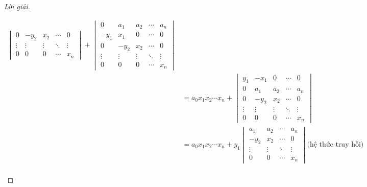 \documentclass[class=linearalgebra,crop=false]{standalone}
\begin{document}
\begin{proof}[Lời giải]
\begin{enumerate}[label = (\alph*)]
\begin{align*}
\begin{vmatrix}
                      0      & -y_{2} & x_{2}  & \cdots & 0      \\
                      \vdots & \vdots & \vdots & \ddots & \vdots \\
                      0      & 0      & 0      & \cdots & x_{n}
                  \end{vmatrix}
                  +
                  \begin{vmatrix}
                      0      & a_{1}  & a_{2}  & \cdots & a_{n}  \\
                      -y_{1} & x_{1}  & 0      & \cdots & 0      \\
                      0      & -y_{2} & x_{2}  & \cdots & 0      \\
                      \vdots & \vdots & \vdots & \ddots & \vdots \\
                      0      & 0      & 0      & \cdots & x_{n}
                  \end{vmatrix}                                                                         \\
                   & =
                  a_{0}x_{1}x_{2}\cdots x_{n}
                  +
                  \begin{vmatrix}
                      y_{1}  & -x_{1} & 0      & \cdots & 0      \\
                      0      & a_{1}  & a_{2}  & \cdots & a_{n}  \\
                      0      & -y_{2} & x_{2}  & \cdots & 0      \\
                      \vdots & \vdots & \vdots & \ddots & \vdots \\
                      0      & 0      & 0      & \cdots & x_{n}
                  \end{vmatrix}                                                                         \\
                   & =
                  a_{0}x_{1}x_{2}\cdots x_{n}
                  +
                  y_{1}
                  \begin{vmatrix}
                      a_{1}  & a_{2}  & \cdots & a_{n}  \\
                      -y_{2} & x_{2}  & \cdots & 0      \\
                      \vdots & \vdots & \ddots & \vdots \\
                      0      & 0      & \cdots & x_{n}
                  \end{vmatrix} \text{(hệ thức truy hồi)}                                               \\

\end{align*}
\end{enumerate}
\end{proof}
\end{document}
